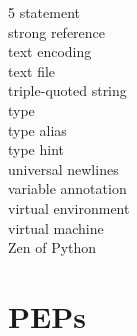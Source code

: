 \documentclass [8pt] {extarticle}
\begin{document}
\begin {multicols} {5}
        statement \\
        strong reference \\
        text encoding \\
        text file \\
        triple-quoted string \\
        type \\
        type alias \\
        type hint \\
        universal newlines \\
        variable annotation \\
        virtual environment \\
        virtual machine \\
        Zen of Python \\
    \end {multicols}

    \section {PEPs}
\end{document}
